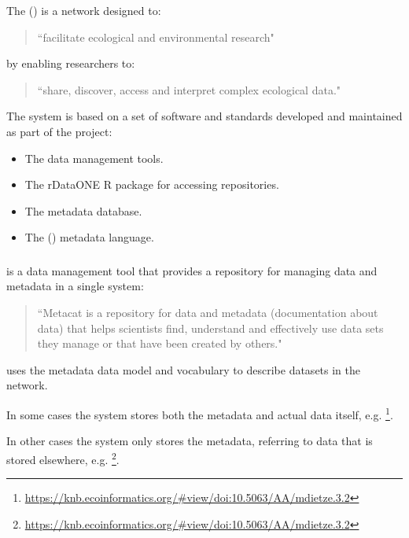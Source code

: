 \documentclass{article}
\begin{document}
The  ({\cite{knb}}) is a network designed to:

\begin{quote}
    ``facilitate ecological and environmental research"
\end{quote}

by enabling researchers to:

\begin{quote}
    ``share, discover, access and interpret complex ecological data."
\end{quote}

The \cite{knb} system is based on a set of \cite{open-source} software and
standards developed and maintained as part of the \cite{knb} project:

\begin{itemize}
    \item The \cite{morpho} data management tools.
    \item The rDataONE R package for accessing \cite{data-one} repositories.
    \item The \cite{metacat} metadata database.
    \item The  (\cite{eml}) metadata language.
\end{itemize}

\subsubsection{}

\cite{metacat} is a data management tool that provides a repository for
managing data and metadata in a single system:

\begin{quote}
``Metacat is a repository for data and metadata (documentation about data)
that helps scientists find, understand and effectively use data sets they
manage or that have been created by others."
\end{quote}

\cite{metacat} uses the \cite{eml} metadata data model and vocabulary to
describe datasets in the network.

In some cases the \cite{metacat} system stores both the metadata and actual
data itself, e.g.
\footnote{\url{https://knb.ecoinformatics.org/#view/doi:10.5063/AA/mdietze.3.2}}.

In other cases the \cite{metacat} system only stores the metadata, referring
to data that is stored elsewhere, e.g.
\footnote{\url{https://knb.ecoinformatics.org/#view/doi:10.5063/AA/mdietze.3.2}}.
\end{document}
